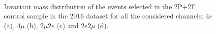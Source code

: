 \begin{figure}[!htb]
\begin{center}
         \\
\caption{
Invariant mass distribution of the events selected in the 2P+2F control sample in the
2016 dataset for all the considered channels: $4e$ (a), $4\mu$ (b), $2\mu2e$ (c) and $2e2\mu$ (d).
}
\label{fig:2P2F_dataMC2016}
\end{center}
\end{figure}


